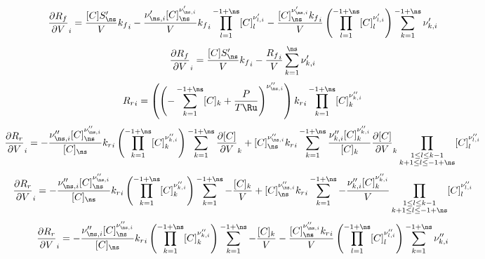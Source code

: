 \documentclass[a4paper,10pt]{article}
\begin{document}
\begin{dmath} \frac{\partial {R_f} }{\partial V }_{i} = \frac{[C] S^{\prime}_{\ns}}{V} {k_f}_{i} - \frac{\nu^{\prime}_{\ns,i} [C]_{\ns}^{\nu^{\prime}_{\ns,i}}}{V} {k_f}_{i} \prod_{l=1}^{-1 + \ns} [C]_{l}^{\nu^{\prime}_{l,i}} - \frac{[C]_{\ns}^{\nu^{\prime}_{\ns,i}} {k_f}_{i}}{V} \left(\prod_{l=1}^{-1 + \ns} [C]_{l}^{\nu^{\prime}_{l,i}}\right) \sum_{k=1}^{-1 + \ns} \nu^{\prime}_{k,i}\end{dmath} 
\begin{dmath} \frac{\partial {R_f} }{\partial V }_{i} = \frac{[C] S^{\prime}_{\ns}}{V} {k_f}_{i} - \frac{{R_f}_{i}}{V} \sum_{k=1}^{\ns} \nu^{\prime}_{k,i}\end{dmath} 
\begin{dmath} {R_r}_{i} = \left(\left(- \sum_{k=1}^{-1 + \ns} [C]_{k} + \frac{P}{T \Ru}\right)^{\nu^{\prime\prime}_{\ns,i}}\right) {k_r}_{i} \prod_{k=1}^{-1 + \ns} [C]_{k}^{\nu^{\prime\prime}_{k,i}}\end{dmath} 
\begin{dmath} \frac{\partial {R_r} }{\partial V }_{i} = - \frac{\nu^{\prime\prime}_{\ns,i} [C]_{\ns}^{\nu^{\prime\prime}_{\ns,i}}}{[C]_{\ns}} {k_r}_{i} \left(\prod_{k=1}^{-1 + \ns} [C]_{k}^{\nu^{\prime\prime}_{k,i}}\right) \sum_{k=1}^{-1 + \ns} \frac{\partial [C] }{\partial V }_{k} + [C]_{\ns}^{\nu^{\prime\prime}_{\ns,i}} {k_r}_{i} \sum_{k=1}^{-1 + \ns} \frac{\nu^{\prime\prime}_{k,i} [C]_{k}^{\nu^{\prime\prime}_{k,i}}}{[C]_{k}} \frac{\partial [C] }{\partial V }_{k} \prod_{\substack{1 \leq l \leq k - 1\\k + 1 \leq l \leq -1 + \ns}} [C]_{l}^{\nu^{\prime\prime}_{l,i}}\end{dmath} 
\begin{dmath} \frac{\partial {R_r} }{\partial V }_{i} = - \frac{\nu^{\prime\prime}_{\ns,i} [C]_{\ns}^{\nu^{\prime\prime}_{\ns,i}}}{[C]_{\ns}} {k_r}_{i} \left(\prod_{k=1}^{-1 + \ns} [C]_{k}^{\nu^{\prime\prime}_{k,i}}\right) \sum_{k=1}^{-1 + \ns} - \frac{[C]_{k}}{V} + [C]_{\ns}^{\nu^{\prime\prime}_{\ns,i}} {k_r}_{i} \sum_{k=1}^{-1 + \ns} - \frac{\nu^{\prime\prime}_{k,i} [C]_{k}^{\nu^{\prime\prime}_{k,i}}}{V} \prod_{\substack{1 \leq l \leq k - 1\\k + 1 \leq l \leq -1 + \ns}} [C]_{l}^{\nu^{\prime\prime}_{l,i}}\end{dmath} 
\begin{dmath} \frac{\partial {R_r} }{\partial V }_{i} = - \frac{\nu^{\prime\prime}_{\ns,i} [C]_{\ns}^{\nu^{\prime\prime}_{\ns,i}}}{[C]_{\ns}} {k_r}_{i} \left(\prod_{k=1}^{-1 + \ns} [C]_{k}^{\nu^{\prime\prime}_{k,i}}\right) \sum_{k=1}^{-1 + \ns} - \frac{[C]_{k}}{V} - \frac{[C]_{\ns}^{\nu^{\prime\prime}_{\ns,i}} {k_r}_{i}}{V} \left(\prod_{l=1}^{-1 + \ns} [C]_{l}^{\nu^{\prime\prime}_{l,i}}\right) \sum_{k=1}^{-1 + \ns} \nu^{\prime\prime}_{k,i}\end{dmath} 
\end{document}
